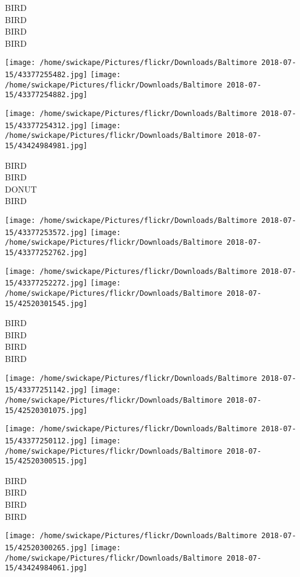 \documentclass[10pt,letterpaper]{article}
\begin{document}
BIRD\\
BIRD\\
BIRD\\
BIRD
\pagebreak

\texttt{[image: /home/swickape/Pictures/flickr/Downloads/Baltimore 2018-07-15/43377255482.jpg]}
\texttt{[image: /home/swickape/Pictures/flickr/Downloads/Baltimore 2018-07-15/43377254882.jpg]}

\texttt{[image: /home/swickape/Pictures/flickr/Downloads/Baltimore 2018-07-15/43377254312.jpg]}
\texttt{[image: /home/swickape/Pictures/flickr/Downloads/Baltimore 2018-07-15/43424984981.jpg]}

BIRD\\
BIRD\\
DONUT\\
BIRD
\pagebreak

\texttt{[image: /home/swickape/Pictures/flickr/Downloads/Baltimore 2018-07-15/43377253572.jpg]}
\texttt{[image: /home/swickape/Pictures/flickr/Downloads/Baltimore 2018-07-15/43377252762.jpg]}

\texttt{[image: /home/swickape/Pictures/flickr/Downloads/Baltimore 2018-07-15/43377252272.jpg]}
\texttt{[image: /home/swickape/Pictures/flickr/Downloads/Baltimore 2018-07-15/42520301545.jpg]}

BIRD\\
BIRD\\
BIRD\\
BIRD
\pagebreak

\texttt{[image: /home/swickape/Pictures/flickr/Downloads/Baltimore 2018-07-15/43377251142.jpg]}
\texttt{[image: /home/swickape/Pictures/flickr/Downloads/Baltimore 2018-07-15/42520301075.jpg]}

\texttt{[image: /home/swickape/Pictures/flickr/Downloads/Baltimore 2018-07-15/43377250112.jpg]}
\texttt{[image: /home/swickape/Pictures/flickr/Downloads/Baltimore 2018-07-15/42520300515.jpg]}

BIRD\\
BIRD\\
BIRD\\
BIRD
\pagebreak

\texttt{[image: /home/swickape/Pictures/flickr/Downloads/Baltimore 2018-07-15/42520300265.jpg]}
\texttt{[image: /home/swickape/Pictures/flickr/Downloads/Baltimore 2018-07-15/43424984061.jpg]}
\end{document}
